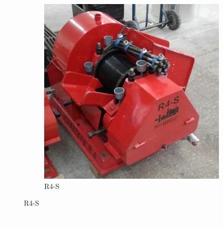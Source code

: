 \documentclass{article}%
\begin{document}
\begin{figure}[h!]
\begin{subfigure}{0.33\linewidth}
\includegraphics[width=0.95\linewidth]{Molinos/R4-S.jpg}%
\caption{R4{-}S}%
\end{subfigure}%
\linebreak%
\newpage%
\end{figure}

%
\newpage%
\textcolor{white}{ 
HH
}%
\newpage%
\end{document}
